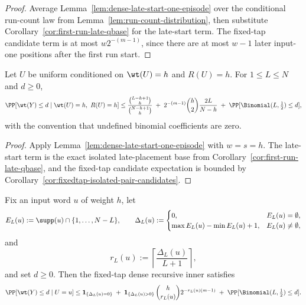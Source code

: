 \begin{proof}
Average Lemma~\ref{lem:dense-late-start-one-episode} over the conditional run-count law from
Lemma~\ref{lem:run-count-distribution}, then substitute Corollary~\ref{cor:first-run-late-qbase} for the
late-start term. The fixed-tap candidate term is at most \(w2^{-(m-1)}\), since there are at most \(w-1\) later
input-one positions after the first run start.
\end{proof}

\begin{corollary}
\label{cor:fixedtap-isolated-one-episode}
Let \(U\) be uniform conditioned on \(\wt(U)=h\) and \(R(U)=h\). For \(1\le L\le N\) and \(d\ge 0\),
\[
\PP[\wt(Y)\le d\mid \wt(U)=h,\ R(U)=h]
\le
\frac{\binom{L-h+1}{h}}{\binom{N-h+1}{h}}
\;+\;
2^{-(m-1)}\binom{h}{2}\frac{2L}{N-h}
\;+\;
\PP[\Binomial(L,\tfrac12)\le d],
\]
with the convention that undefined binomial coefficients are zero.
\end{corollary}

\begin{proof}
Apply Lemma~\ref{lem:dense-late-start-one-episode} with \(w=s=h\). The late-start term is the exact isolated
late-placement base from Corollary~\ref{cor:first-run-late-qbase}, and the fixed-tap candidate expectation is bounded
by Corollary~\ref{cor:fixedtap-isolated-pair-candidates}.
\end{proof}

\begin{lemma}
\label{lem:fixedtap-multiepisode-earlyspan}
Fix an input word \(u\) of weight \(h\), let
\[
E_L(u):=\supp(u)\cap\{1,\dots,N-L\},
\qquad
\Delta_L(u):=
\begin{cases}
0, & E_L(u)=\emptyset,\\
\max E_L(u)-\min E_L(u)+1, & E_L(u)\ne\emptyset,
\end{cases}
\]
and
\[
r_L(u):=\left\lceil \frac{\Delta_L(u)}{L+1}\right\rceil,
\]
and set \(d\ge 0\). Then the fixed-tap dense recursive inner satisfies
\[
\PP[\wt(Y)\le d\mid U=u]
\le
\mathbf{1}_{\{\Delta_L(u)=0\}}
\;+\;
\mathbf{1}_{\{\Delta_L(u)>0\}}\,
\binom{h}{r_L(u)}2^{-r_L(u)(m-1)}
\;+\;
\PP[\Binomial(L,\tfrac12)\le d].
\]
\end{lemma}

